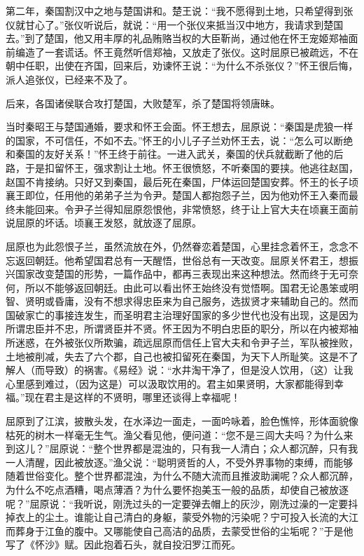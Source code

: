 \documentclass[12pt,UTF-8,openany,a4]{ctexbook}
\begin{document}
\begin{large}
    第二年，秦国割汉中之地与楚国讲和。楚王说：“我不愿得到土地，只希望得到张仪就甘心了。”张仪听说后，就说：“用一个张仪来抵当汉中地方，我请求到楚国去。”到了楚国，他又用丰厚的礼品贿赂当权的大臣靳尚，通过他在怀王宠姬郑袖面前编造了一套谎话。怀王竟然听信郑袖，又放走了张仪。这时屈原已被疏远，不在朝中任职，出使在齐国，回来后，劝谏怀王说：“为什么不杀张仪？”怀王很后悔，派人追张仪，已经来不及了。
    
    后来，各国诸侯联合攻打楚国，大败楚军，杀了楚国将领唐昧。
    
    当时秦昭王与楚国通婚，要求和怀王会面。怀王想去，屈原说：“秦国是虎狼一样的国家，不可信任，不如不去。”怀王的小儿子子兰劝怀王去，说：“怎么可以断绝和秦国的友好关系！”怀王终于前往。一进入武关，秦国的伏兵就截断了他的后路，于是扣留怀王，强求割让土地。怀王很愤怒，不听秦国的要挟。他逃往赵国，赵国不肯接纳。只好又到秦国，最后死在秦国，尸体运回楚国安葬。怀王的长子顷襄王即位，任用他的弟弟子兰为令尹。楚国人都抱怨子兰，因为他劝怀王入秦而最终未能回来。令尹子兰得知屈原怨恨他，非常愤怒，终于让上官大夫在顷襄王面前说屈原的坏话。顷襄王发怒，就放逐了屈原。
    
    屈原也为此怨恨子兰，虽然流放在外，仍然眷恋着楚国，心里挂念着怀王，念念不忘返回朝廷。他希望国君总有一天醒悟，世俗总有一天改变。屈原关怀君王，想振兴国家改变楚国的形势，一篇作品中，都再三表现出来这种想法。然而终于无可奈何，所以不能够返回朝廷。由此可以看出怀王始终没有觉悟啊。国君无论愚笨或明智、贤明或昏庸，没有不想求得忠臣来为自己服务，选拔贤才来辅助自己的。然而国破家亡的事接连发生，而圣明君主治理好国家的多少世代也没有出现，这是因为所谓忠臣并不忠，所谓贤臣并不贤。怀王因为不明白忠臣的职分，所以在内被郑袖所迷惑，在外被张仪所欺骗，疏远屈原而信任上官大夫和令尹子兰，军队被挫败，土地被削减，失去了六个郡，自己也被扣留死在秦国，为天下人所耻笑。这是不了解人（而导致）的祸害。《易经》说：“水井淘干净了，但是没人饮用，（这）让我心里感到难过，（因为这是）可以汲取饮用的。君主如果贤明，大家都能得到幸福。”现在君主是这样的不贤明，哪里还谈得上幸福呢！
    
    屈原到了江滨，披散头发，在水泽边一面走，一面吟咏着，脸色憔悴，形体面貌像枯死的树木一样毫无生气。渔父看见他，便问道：“您不是三闾大夫吗？为什么来到这儿？”屈原说：“整个世界都是混浊的，只有我一人清白；众人都沉醉，只有我一人清醒，因此被放逐。”渔父说：“聪明贤哲的人，不受外界事物的束缚，而能够随着世俗变化。整个世界都混浊，为什么不随大流而且推波助澜呢？众人都沉醉，为什么不吃点酒糟，喝点薄酒？为什么要怀抱美玉一般的品质，却使自己被放逐呢？”屈原说：“我听说，刚洗过头的一定要弹去帽上的灰沙，刚洗过澡的一定要抖掉衣上的尘土。谁能让自己清白的身躯，蒙受外物的污染呢？宁可投入长流的大江而葬身于江鱼的腹中。又哪能使自己高洁的品质，去蒙受世俗的尘垢呢？”于是他写了《怀沙》赋。因此抱着石头，就自投汨罗江而死。
    

\end{large}
\end{document}

